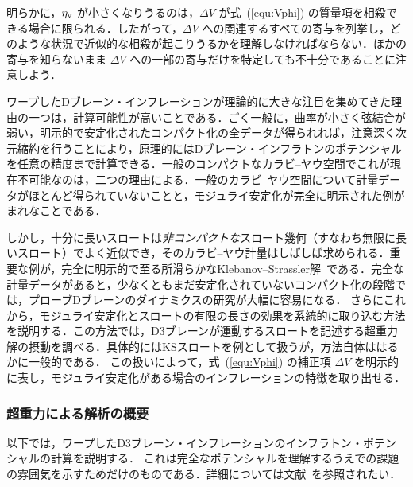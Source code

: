 明らかに，$\eta_{\rm v}$ が小さくなりうるのは，$\Delta V$ が式~(\ref{equ:Vphi}) の質量項を相殺できる場合に限られる．したがって，$\Delta V$ への関連するすべての寄与を列挙し，どのような状況で近似的な相殺が起こりうるかを理解しなければならない．ほかの寄与を知らないまま $\Delta V$ への一部の寄与だけを特定しても不十分であることに注意しよう．

ワープしたDブレーン・インフレーションが理論的に大きな注目を集めてきた理由の一つは，計算可能性が高いことである．ごく一般に，曲率が小さく弦結合が弱い，明示的で安定化されたコンパクト化の全データが得られれば，注意深く次元縮約を行うことにより，原理的にはDブレーン・インフラトンのポテンシャルを任意の精度まで計算できる．一般のコンパクトなカラビ--ヤウ空間でこれが現在不可能なのは，二つの理由による．一般のカラビ--ヤウ空間について計量データがほとんど得られていないことと，モジュライ安定化が完全に明示された例がまれなことである．

しかし，十分に長いスロートは{\it 非コンパクトな}スロート幾何（すなわち無限に長いスロート）でよく近似でき，そのカラビ--ヤウ計量はしばしば求められる．重要な例が，完全に明示的で至る所滑らかなKlebanov--Strassler解~\cite{KS}である．完全な計量データがあると，少なくともまだ安定化されていないコンパクト化の段階では，プローブDブレーンのダイナミクスの研究が大幅に容易になる．
さらにこれから，モジュライ安定化とスロートの有限の長さの効果を系統的に取り込む方法を説明する．この方法では，D3ブレーンが運動するスロートを記述する超重力解の摂動を調べる．具体的にはKSスロートを例として扱うが，方法自体ははるかに一般的である．
この扱いによって，式~(\ref{equ:Vphi}) の補正項 $\Delta V$ を明示的に表し，モジュライ安定化がある場合のインフレーションの特徴を取り出せる．

\subsubsection{超重力による解析の概要}

以下では，ワープしたD3ブレーン・インフレーションのインフラトン・ポテンシャルの計算を説明する．
これは完全なポテンシャルを理解するうえでの課題の雰囲気を示すためだけのものである．詳細については文献~\cite{KKLMMT, Baumann:2006th, Baumann:2007ah, Baumann:2008kq, Baumann:2007np}を参照されたい．

